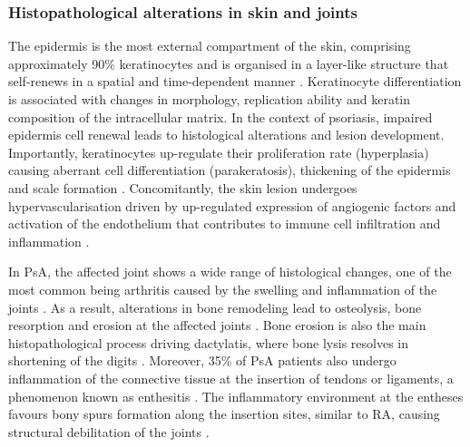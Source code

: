 \subsubsection*{Histopathological alterations in skin and joints}

The epidermis is the most external compartment of the skin, comprising approximately 90\% keratinocytes  and is organised in a layer-like structure that self-renews in a spatial and time-dependent manner \parencite{Wikramanayake2014}. Keratinocyte differentiation is associated with changes in morphology, replication ability and keratin composition of the intracellular matrix. In the context of psoriasis, impaired epidermis cell renewal leads to histological alterations and lesion development. Importantly,  keratinocytes up-regulate their proliferation rate (hyperplasia) causing aberrant cell differentiation (parakeratosis), thickening of the epidermis and scale formation \parencite{Ruchusatsawat2011}. Concomitantly, the skin lesion undergoes hypervascularisation driven by up-regulated expression of angiogenic factors and activation of the endothelium that contributes to immune cell infiltration and inflammation \parencite{Perera2012}.  

In PsA, the affected joint shows a wide range of histological changes, one of the most common being arthritis caused by the swelling and inflammation of the joints \parencite{Haddad2013,Schett2011}. As a result, alterations in bone remodeling lead to osteolysis, bone resorption and erosion at the affected joints \parencite{Mensah2008}. Bone erosion is also the main histopathological process driving dactylatis, where bone lysis resolves in shortening of the digits \parencite{Gladman2005}. Moreover, 35\% of PsA patients also undergo inflammation of the connective tissue at the insertion of tendons or ligaments, a phenomenon known as enthesitis \parencite{McGonagle2011,Polachek2017}. The inflammatory environment at the entheses favours bony spurs formation along the insertion sites, similar to RA, causing structural debilitation of the joints \parencite{Benjamin2009,Finzel2014}.



